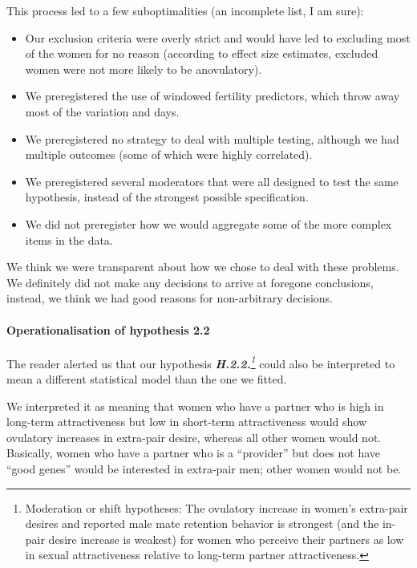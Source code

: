 \documentclass[]{article}
\providecommand{\tightlist}{%
  \setlength{\itemsep}{0pt}\setlength{\parskip}{0pt}}
\let\oldparagraph\paragraph
\renewcommand{\paragraph}[1]{\oldparagraph{#1}\mbox{}}
\let\rmarkdownfootnote\footnote%
\def\footnote{\protect\rmarkdownfootnote}
\begin{document}
This process led to a few suboptimalities (an incomplete list, I am
sure):

\begin{itemize}
\tightlist
\item
  Our exclusion criteria were overly strict and would have led to
  excluding most of the women for no reason (according to effect size
  estimates, excluded women were not more likely to be anovulatory).
\item
  We preregistered the use of windowed fertility predictors, which throw
  away most of the variation and days.
\item
  We preregistered no strategy to deal with multiple testing, although
  we had multiple outcomes (some of which were highly correlated).
\item
  We preregistered several moderators that were all designed to test the
  same hypothesis, instead of the strongest possible specification.
\item
  We did not preregister how we would aggregate some of the more complex
  items in the data.
\end{itemize}

We think we were transparent about how we chose to deal with these
problems. We definitely did not make any decisions to arrive at foregone
conclusions, instead, we think we had good reasons for non-arbitrary
decisions.

\hypertarget{operationalisation-of-hypothesis-2.2}{%
\paragraph{Operationalisation of hypothesis
2.2}\label{operationalisation-of-hypothesis-2.2}}

The reader alerted us that our hypothesis
\emph{\textbf{H.2.2.}\footnote{Moderation or shift hypotheses: The
  ovulatory increase in women's extra-pair desires and reported male
  mate retention behavior is strongest (and the in-pair desire increase
  is weakest) for women who perceive their partners as low in sexual
  attractiveness relative to long-term partner attractiveness.}} could
also be interpreted to mean a different statistical model than the one
we fitted.

We interpreted it as meaning that women who have a partner who is high
in long-term attractiveness but low in short-term attractiveness would
show ovulatory increases in extra-pair desire, whereas all other women
would not. Basically, women who have a partner who is a ``provider'' but
does not have ``good genes'' would be interested in extra-pair men;
other women would not be.
\end{document}
